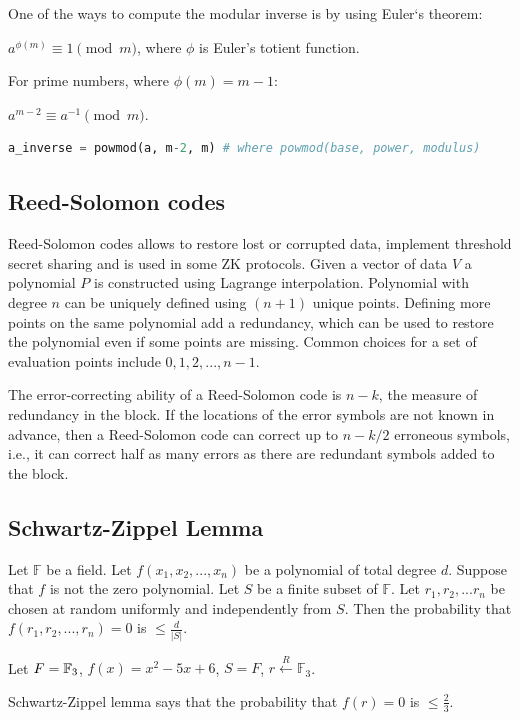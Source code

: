 \documentclass[../lecture-notes.tex]{subfiles}
\begin{document}
One of the ways to compute the modular inverse is by using Euler`s theorem:

$a^{\phi(m)} \equiv 1 \pmod{m}$, where $\phi$ is Euler's totient function. 

For prime numbers, where $\phi(m) = m-1$:

$a^{m-2} \equiv a^{-1} \pmod{m}$.

\begin{lstlisting}[language=Python]
    a_inverse = powmod(a, m-2, m) # where powmod(base, power, modulus)
\end{lstlisting}

\subsection{Reed-Solomon codes}

Reed-Solomon codes allows to restore lost or corrupted data, implement threshold secret sharing and is used in some ZK protocols.
Given a vector of data $V$ a polynomial $P$ is constructed using Lagrange interpolation.
Polynomial with degree $n$ can be uniquely defined using $(n+1)$ unique points. Defining more points on the same polynomial add a redundancy,
which can be used to restore the polynomial even if some points are missing.
Common choices for a set of evaluation points include ${0, 1, 2, ..., n - 1}$.

The error-correcting ability of a Reed-Solomon code is $n-k$, the measure of redundancy in the block. 
If the locations of the error symbols are not known in advance, then a Reed-Solomon code can correct up to
$n-k/2$ erroneous symbols, i.e., it can correct half as many errors as there are redundant symbols added to the block.

\subsection{Schwartz-Zippel Lemma}

\begin{lemma}\label{lemma:sz}
Let $\mathbb{F}$ be a field. Let $f(x_1, x_2, ..., x_n)$ be a polynomial of total degree $d$. Suppose that $f$ is not the zero polynomial. Let $S$ be
a finite subset of $\mathbb{F}$. Let $r_1, r_2, ... r_n$ be chosen at random uniformly and independently from $S$. Then the probability that 
$f(r_1, r_2, ..., r_n) = 0$ is $\le \frac{d}{|S|}$.
\end{lemma}

\begin{example}
Let $F = \mathbb{F}_3$, $f(x) = x^2 - 5x + 6$, $S = F$, $r \xleftarrow{R} \mathbb{F}_3$.

Schwartz-Zippel lemma says that the probability that $f(r) = 0$ is $\le \frac{2}{3}$.
\end{example}
\end{document}
